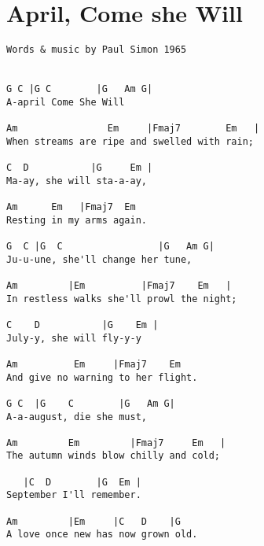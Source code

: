 \documentclass[leqno]{memoir}
\begin{document}
\chapter{April, Come she Will}
\begin{verbatim}
Words & music by Paul Simon 1965


G C |G C        |G   Am G| 
A-april Come She Will

Am                Em     |Fmaj7        Em   |   
When streams are ripe and swelled with rain;

C  D           |G     Em |
Ma-ay, she will sta-a-ay,

Am      Em   |Fmaj7  Em  
Resting in my arms again.

G  C |G  C                 |G   Am G|
Ju-u-une, she'll change her tune,

Am         |Em          |Fmaj7    Em   |  
In restless walks she'll prowl the night;

C    D           |G    Em |
July-y, she will fly-y-y

Am          Em     |Fmaj7    Em
And give no warning to her flight.

G C  |G    C        |G   Am G| 
A-a-august, die she must,

Am         Em         |Fmaj7     Em   |
The autumn winds blow chilly and cold;

   |C  D        |G  Em |
September I'll remember.

Am         |Em     |C   D    |G
A love once new has now grown old. 
\end{verbatim}
\newpage
\end{document}

